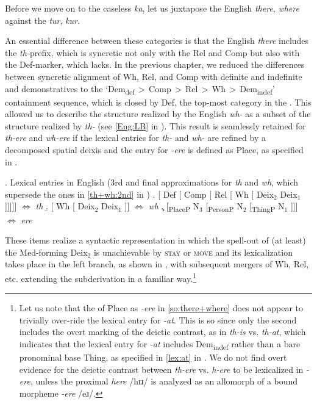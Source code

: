 \noindent
Before we move on to the  caseless  \textit{ka}, let us juxtapose the English \textit{there}, \textit{where} against the  \textit{tur}, \textit{kur}.
\par An essential difference between these categories is that the English \textit{there} includes the \textit{th-}prefix, which is syncretic not only with the Rel and Comp but also with the Def-marker, which  lacks. In the previous chapter, we reduced the differences between syncretic alignment of Wh, Rel, and Comp with definite and indefinite and demonstratives to the `Dem\textsubscript{def}\,$>$\,Comp\,$>$\,Rel\,$>$\,Wh\,$>$\,Dem\textsubscript{indef}' containment sequence, which is closed by Def, the top-most category in the . This allowed us to describe the structure realized by the English \textit{wh-} as a subset of the structure realized by \textit{th-} (see \ref{Eng:LB} in ). This result is seamlessly  retained for \textit{th-ere} and \textit{wh-ere} if the lexical entries for \textit{th-} and \textit{wh-} are refined by a decomposed spatial deixis and the entry for \textit{-ere} is defined as Place, as specified in \Next.  

\ex. Lexical entries in English (3rd and final approximations for \textit{th} and \textit{wh}, which supersede the ones in \ref{th+wh:2nd} in )
\a. [ Def [ Comp [ Rel [ Wh [ Deix$_{2}$ Deix$_{1}$ ]]]]] $\Leftrightarrow$ \textit{th}
\b. [ Wh [ Deix$_{2}$ Deix$_{1}$ ]]  $\Leftrightarrow$ \textit{wh}
\c. [\textsubscript{PlaceP} N$_{3}$ [\textsubscript{PersonP} N$_{2}$ [\textsubscript{ThingP} N$_{1}$ ]]] $\Leftrightarrow$ \textit{ere}

These items realize a syntactic representation in which the spell-out of (at least) the Med-forming  Deix$_{2}$ is unachievable by \textsc{stay} or \textsc{move} and its lexicalization takes place in the left branch, as shown in \Next, with subsequent mergers of Wh, Rel, etc. extending the subderivation in a familiar way.\footnote{Let us note that the  of Place as \textit{-ere} in \ref{so:there+where} does not appear to trivially over-ride  the lexical entry for \textit{-at}. This is so since only the second includes the overt marking of the deictic contrast, as in \textit{th-is} vs. \textit{th-at}, which indicates that the lexical entry for \textit{-at} includes Dem\textsubscript{indef} rather than a bare pronominal base Thing, as specified in \ref{lex:at} in . We do not find overt evidence for the deictic contrast between \textit{th-ere} vs. \textit{h-ere} to be lexicalized in \textit{-ere}, unless the proximal \textit{here} /hɪɹ/ is analyzed as an allomorph  of a bound morpheme \textit{-ere} /eɹ/.  
}%

